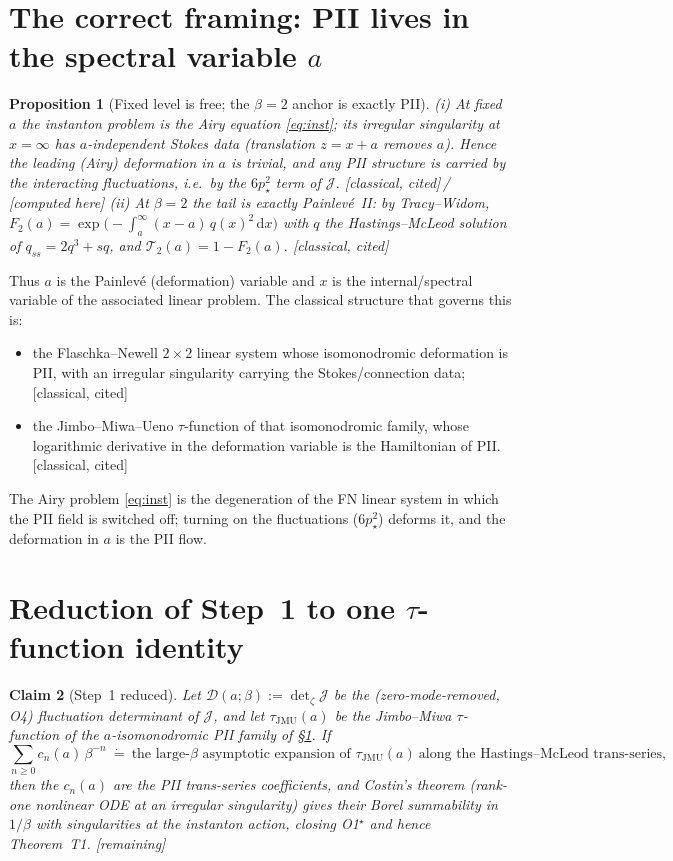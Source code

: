 \documentclass[11pt,reqno]{amsart}
\theoremstyle{plain}
\newtheorem{proposition}{Proposition}
\newtheorem{claim}[proposition]{Claim}
\theoremstyle{remark}
\newcommand{\dd}{\,\mathrm{d}}
\newcommand{\pinst}{p_\star}
\newcommand{\OK}{{\footnotesize\textsf{[computed here]}}}
\newcommand{\cited}{{\footnotesize\textsf{[classical, cited]}}}
\newcommand{\gap}{{\footnotesize\textsf{[remaining]}}}
\begin{document}
\section{The correct framing: PII lives in the spectral variable $a$}\label{sec:iso}

\begin{proposition}[Fixed level is free; the $\beta=2$ anchor is exactly PII]\label{prop:anchor}
(i) At fixed $a$ the instanton problem is the Airy equation \eqref{eq:inst}; its irregular
singularity at $x=\infty$ has $a$-independent Stokes data (translation $z=x+a$ removes $a$). Hence
the leading (Airy) deformation in $a$ is trivial, and any PII structure is carried by the
interacting fluctuations, i.e.\ by the $6\pinst^2$ term of $\mathcal J$. \cited\,/\,\OK
(ii) At $\beta=2$ the tail is \emph{exactly} Painlev\'e~II: by Tracy--Widom,
$F_2(a)=\exp\!\bigl(-\int_a^\infty (x-a)\,q(x)^2\dd x\bigr)$ with $q$ the Hastings--McLeod solution
of $q_{ss}=2q^3+sq$, and $\mathcal T_2(a)=1-F_2(a)$. \cited
\end{proposition}

Thus $a$ is the Painlev\'e (deformation) variable and $x$ is the internal/spectral variable of the
associated linear problem. The classical structure that governs this is:
\begin{itemize}
\item[(FN)] the Flaschka--Newell $2\times2$ linear system whose isomonodromic deformation is PII,
with an irregular singularity carrying the Stokes/connection data; \cited
\item[(JMU)] the Jimbo--Miwa--Ueno $\tau$-function of that isomonodromic family, whose logarithmic
derivative in the deformation variable is the Hamiltonian of PII. \cited
\end{itemize}
The Airy problem \eqref{eq:inst} is the degeneration of the FN linear system in which the PII field
is switched off; turning on the fluctuations ($6\pinst^2$) deforms it, and the deformation in $a$
is the PII flow.

\section{Reduction of Step~1 to one $\tau$-function identity}

\begin{claim}[Step~1 reduced]\label{cl:reduce}
Let $\mathcal D(a;\beta):=\det\nolimits_\zeta\mathcal J$ be the (zero-mode-removed, O4)
fluctuation determinant of $\mathcal J$, and let $\tau_{\mathrm{JMU}}(a)$ be the Jimbo--Miwa
$\tau$-function of the $a$-isomonodromic PII family of \S\ref{sec:iso}. If
\begin{equation}\label{eq:tauid}
\sum_{n\ge0}c_n(a)\,\beta^{-n}\ \dot=\ \text{the large-$\beta$ asymptotic expansion of }
\tau_{\mathrm{JMU}}(a)\ \text{along the Hastings--McLeod trans-series,}
\end{equation}
then the $c_n(a)$ are the PII trans-series coefficients, and Costin's theorem
(rank-one nonlinear ODE at an irregular singularity) gives their Borel summability in $1/\beta$
with singularities at the instanton action, closing O1$^\star$ and hence Theorem~T1. \gap
\end{claim}
\end{document}

